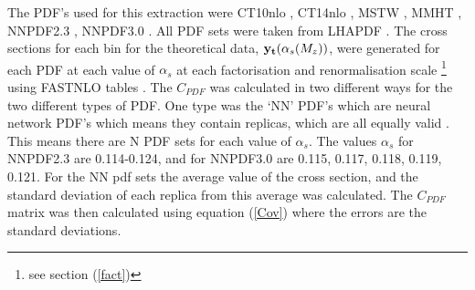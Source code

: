 \documentclass[12pt, onecolumn, nofootinbib]{revtex4}    %
\begin{document}
{The PDF's used for this extraction were CT10nlo \cite{CT10}, CT14nlo \cite{CT14}, MSTW \cite{MSTW}, MMHT \cite{MMHT1, MMHT2}, NNPDF2.3 \cite{NN23}, NNPDF3.0 \cite{NN30}. All PDF sets were taken from LHAPDF \cite{LHAPDF}. The cross sections for each bin for the theoretical data, ${\bold{y_t}(\alpha_s(M_z))}$, were generated for each PDF at each value of ${\alpha_s}$ at each factorisation and renormalisation scale \footnote{ see section (\ref{fact})} using FASTNLO tables \cite{FAST}. The ${C_{PDF}}$ was calculated in two different ways for the two different types of PDF. One type was the `NN' PDF's which are neural network PDF's which means they contain replicas, which are all equally valid \cite{NN23}.  This means there are N PDF sets for each value of ${\alpha_s}$. The values ${\alpha_s}$ for NNPDF2.3 are 0.114-0.124, and for NNPDF3.0 are 0.115, 0.117, 0.118, 0.119, 0.121.  For the NN pdf sets the average value of the cross section, and the standard deviation of each replica from this average was calculated. The ${C_{PDF}}$ matrix was then calculated using equation (\ref{Cov}) where the errors are the standard deviations.

}
\end{document}
